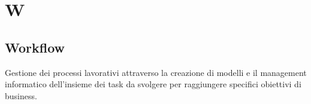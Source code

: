 \section*{W}
\subsection*{Workflow}
Gestione dei processi lavorativi attraverso la creazione di modelli e il management informatico dell'insieme dei task da svolgere per raggiungere specifici obiettivi di business.


